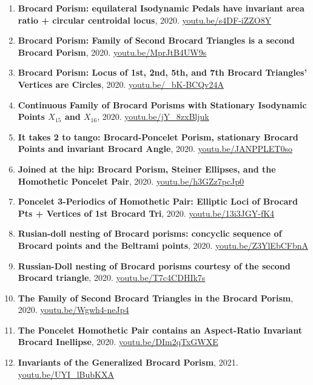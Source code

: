 \documentclass[12pt]{article}
\begin{document}
\begin{enumerate}[resume]
\item \textbf{Brocard Porism: equilateral Isodynamic Pedals have invariant area ratio + circular centroidal locus}, 2020. \href{https://youtu.be/s4DF-iZZO8Y}{\url{youtu.be/s4DF-iZZO8Y}}
\item \textbf{Brocard Porism: Family of Second Brocard Triangles is a second Brocard Porism}, 2020. \href{https://youtu.be/MprJtB4UW9s}{\url{youtu.be/MprJtB4UW9s}}
\item \textbf{Brocard Porism: Locus of 1st, 2nd, 5th, and 7th Brocard Triangles' Vertices are Circles}, 2020. \href{https://youtu.be/_bK-BCQv24A}{\url{youtu.be/\_bK-BCQv24A}}
\item \textbf{Continuous Family of Brocard Porisms with Stationary Isodynamic Points $X_{15}$ and $X_{16}$}, 2020. \href{https://youtu.be/jY_8zxBljuk}{\url{youtu.be/jY\_8zxBljuk}}
\item \textbf{It takes 2 to tango: Brocard-Poncelet Porism, stationary Brocard Points and invariant Brocard Angle}, 2020. \href{https://youtu.be/JANPPLET0so}{\url{youtu.be/JANPPLET0so}}
\item \textbf{Joined at the hip: Brocard Porism, Steiner Ellipses, and the Homothetic Poncelet Pair}, 2020. \href{https://youtu.be/h3GZz7pcJp0}{\url{youtu.be/h3GZz7pcJp0}}
\item \textbf{Poncelet 3-Periodics of Homothetic Pair: Elliptic Loci of Brocard Pts + Vertices of 1st Brocard Tri}, 2020. \href{https://youtu.be/13i3JGY-fK4}{\url{youtu.be/13i3JGY-fK4}}
\item \textbf{Rusian-doll nesting of Brocard porisms: concyclic sequence of Brocard points and the Beltrami points}, 2020. \href{https://youtu.be/Z3YlEbCFbnA}{\url{youtu.be/Z3YlEbCFbnA}}
\item \textbf{Russian-Doll nesting of Brocard porisms courtesy of the second Brocard triangle}, 2020. \href{https://youtu.be/T7c4CDHIk7s}{\url{youtu.be/T7c4CDHIk7s}}
\item \textbf{The Family of Second Brocard Triangles in the Brocard Porism}, 2020. \href{https://youtu.be/Wgwh4-neJp4}{\url{youtu.be/Wgwh4-neJp4}}
\item \textbf{The Poncelet Homothetic Pair contains an Aspect-Ratio Invariant Brocard Inellipse}, 2020. \href{https://youtu.be/DIm2qTxGWXE}{\url{youtu.be/DIm2qTxGWXE}}
\item \textbf{Invariants of the Generalized Brocard Porism}, 2021. \href{https://youtu.be/UYI_lBubKXA}{\url{youtu.be/UYI\_lBubKXA}}
\end{enumerate}
\end{document}
